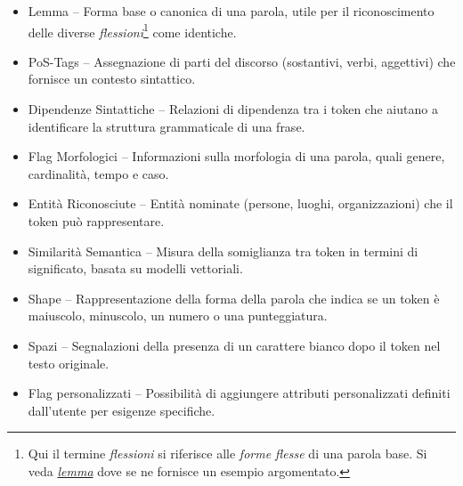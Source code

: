 \documentclass[12pt]{report}
\begin{document}
\begin{itemize}
\item \textsf{Lemma} -- Forma base o canonica di una parola, utile per il riconoscimento delle diverse \textit{flessioni}\footnote{Qui il termine \textit{flessioni} si riferisce alle \textit{forme flesse} di una parola base. Si veda \hyperref[fn:lemma]{\itshape lemma} dove se ne fornisce un esempio argomentato.} come identiche.
\item \textsf{PoS-Tags} -- Assegnazione di parti del discorso (sostantivi, verbi, aggettivi) che fornisce un contesto sintattico.
\item \textsf{Dipendenze Sintattiche} -- Relazioni di dipendenza tra i token che aiutano a identificare la struttura grammaticale di una frase.
\item \textsf{Flag Morfologici} -- Informazioni sulla morfologia di una parola, quali genere, cardinalità, tempo e caso.
\item \textsf{Entità Riconosciute} -- Entità nominate (persone, luoghi, organizzazioni) che il token può rappresentare.
\item \textsf{Similarità Semantica} -- Misura della somiglianza tra token in termini di significato, basata su modelli vettoriali.
\item \textsf{Shape} -- Rappresentazione della forma della parola che indica se un token è maiuscolo, minuscolo, un numero o una punteggiatura.
\item \textsf{Spazi} -- Segnalazioni della presenza di un carattere bianco dopo il token nel testo originale.
\item \textsf{Flag personalizzati} -- Possibilità di aggiungere attributi personalizzati definiti dall'utente per esigenze specifiche.
\end{itemize}

\end{document}
